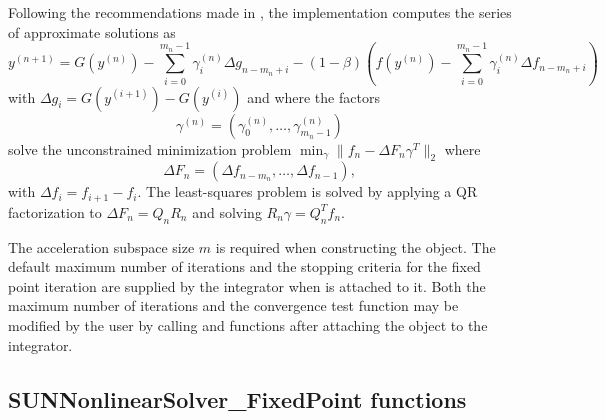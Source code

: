 Following the recommendations made in \cite{Walker-Ni09}, the
{\sunnonlinsolfixedpoint} implementation computes the series of approximate
solutions as
\begin{equation}\label{e:accelerated_fixed_point_iteration_impl}
  y^{(n+1)} = G(y^{(n)})-\sum_{i=0}^{m_n-1} \gamma_i^{(n)} \Delta g_{n-m_n+i} -
  (1 - \beta) (f(y^{(n)}) - \sum_{i=0}^{m_n-1} \gamma_i^{(n)} \Delta f_{n-m_n+i})
\end{equation}
with $\Delta g_i = G(y^{(i+1)}) - G(y^{(i)})$ and where the factors
\begin{equation}
\gamma^{(n)} =(\gamma_0^{(n)}, \ldots, \gamma_{m_n-1}^{(n)})
\end{equation}
solve the unconstrained minimization problem
 $\min_\gamma \| f_n - \Delta F_n \gamma^T \|_2$ where
\begin{equation}
\Delta F_{n} = (\Delta f_{n-m_n}, \ldots, \Delta f_{n-1}),
\end{equation}
with $\Delta f_i = f_{i+1} - f_i$. The least-squares problem is solved by
applying a QR factorization to $\Delta F_n = Q_n R_n$ and solving
 $R_n \gamma = Q_n^T f_n$.

The acceleration subspace size $m$ is required when constructing the
{\sunnonlinsolfixedpoint} object.  The default maximum number of
iterations and the stopping criteria for the fixed point iteration are
supplied by the {\sundials} integrator when {\sunnonlinsolfixedpoint}
is attached to it.  Both the maximum number of iterations and the
convergence test function may be modified by the user by calling
 and 
functions after attaching the {\sunnonlinsolfixedpoint} object to the
integrator.

\subsection{SUNNonlinearSolver\_FixedPoint functions}
\label{ss:sunnonlinsolfixedpoint_functions}

